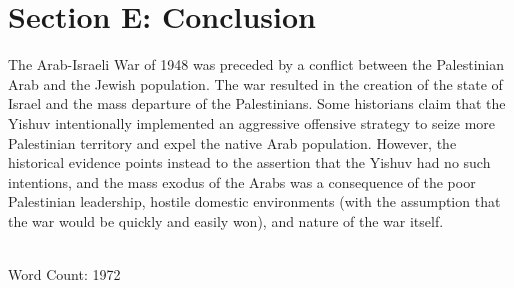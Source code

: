 \documentclass[11pt]{turabian-researchpaper}
\begin{document}

\section{Section E: Conclusion}
The Arab-Israeli War of 1948 was preceded by a conflict between the Palestinian Arab and the Jewish population.  The war resulted in the creation of the state of Israel and the mass departure of the Palestinians.  Some historians claim that the Yishuv intentionally implemented an aggressive offensive strategy to seize more Palestinian territory and expel the native Arab population.  However, the historical evidence points instead to the assertion that the Yishuv had no such intentions, and the mass exodus of the Arabs was a consequence of the poor Palestinian leadership, hostile domestic environments (with the assumption that the war would be quickly and easily won), and nature of the war itself.

~\\

Word Count: 1972

\printbibliography[title=Section F: Bibliography]{}
\end{document}

